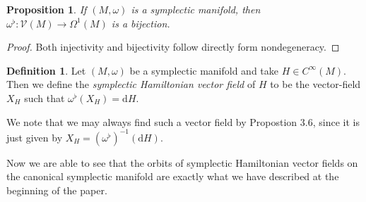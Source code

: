 \documentclass[psamsfonts,12pt]{amsart}
\newcommand\td{\mathrm{d}}
\newcommand\0{\mathbf{0}}
\newcommand\inv{^{-1}}
\theoremstyle{plain}
\newtheorem{prop}[thm]{Proposition}
\theoremstyle{definition}
\newtheorem{dfn}[thm]{Definition} %
\newcommand{\sV}{\mathcal{V}}
\begin{document}
\begin{prop}
If $(M,\omega)$ is a symplectic manifold, then $\omega^\flat \colon \sV(M)\rightarrow \Omega^1(M)$ is a bijection.
\end{prop}
\begin{proof}


Both injectivity and bijectivity follow directly form nondegeneracy.
\end{proof}

\begin{dfn}
Let $(M,\omega)$ be a symplectic manifold and take $H\in C^\infty(M)$.  Then we define the \textit{symplectic Hamiltonian vector field} of $H$ to be the vector-field $X_H$ such that $\omega^\flat(X_H)=\td H$.
\end{dfn}

We note that we may always find such a vector field by Propostion 3.6, since it is just given by $X_H=(\omega^\flat)\inv(\td H)$.

Now we are able to see that the orbits of symplectic Hamiltonian vector fields on the canonical symplectic manifold are exactly what we have described at the beginning of the paper.
\end{document}
